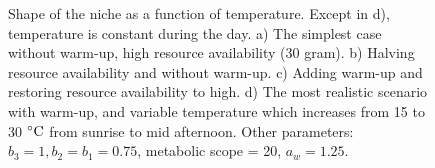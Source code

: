 \vspace{-1.5cm}
%
\begin{figure}[H]
\begin{center}
\caption{
	Shape of the niche as a function of temperature.
	Except in d),  temperature is constant during the day.
	a) The simplest case without warm-up, high resource availability (30 gram).
	b) Halving resource availability and without warm-up.
	c) Adding warm-up and  restoring resource availability to high.
	d) The most realistic scenario with warm-up, and variable temperature  which increases from 15 to 30 $^{\circ} \rm{C}$ from sunrise to mid afternoon.
Other parameters: $b_3 = 1, b_2 = b_1  = 0.75$, metabolic scope = 20, $a_w = 1.25$.
}%
\label{fig5}
\end{center}
\end{figure}
%